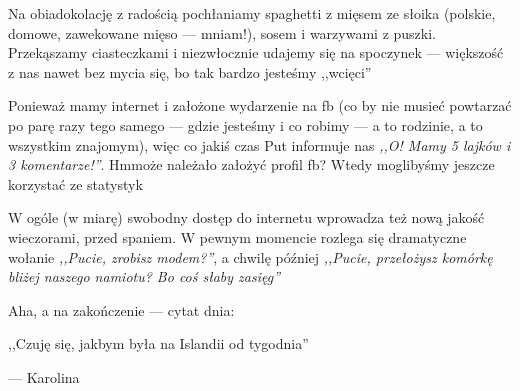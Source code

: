 

Na obiadokolację z radością pochłaniamy spaghetti z mięsem ze słoika (polskie, domowe, zawekowane mięso --- mniam!), sosem i warzywami z puszki. Przekąszamy ciasteczkami i niezwłocznie udajemy się na spoczynek --- większość z nas nawet bez mycia się, bo tak bardzo jesteśmy ,,wcięci''\textellipsis


Ponieważ mamy internet i założone wydarzenie na fb (co by nie musieć powtarzać po parę razy tego samego --- gdzie jesteśmy i co robimy --- a to rodzinie, a to wszystkim znajomym), więc co jakiś czas Put informuje nas \emph{,,O! Mamy 5 lajków i 3 komentarze!''}. Hm\textellipsis może należało założyć profil fb? Wtedy moglibyśmy jeszcze korzystać ze statystyk\textellipsis

W ogóle (w miarę) swobodny dostęp do internetu wprowadza też nową jakość wieczorami, przed spaniem. W pewnym momencie rozlega się dramatyczne wołanie \emph{,,Pucie, zrobisz modem?''}, a chwilę później \emph{,,Pucie, przełożysz komórkę bliżej naszego namiotu? Bo coś słaby zasięg\textellipsis''}

\vspace{16pt}

Aha, a na zakończenie --- cytat dnia:
\epigraph{,,Czuję się, jakbym była na Islandii od tygodnia\textellipsis''}{--- \textup{Karolina}}


